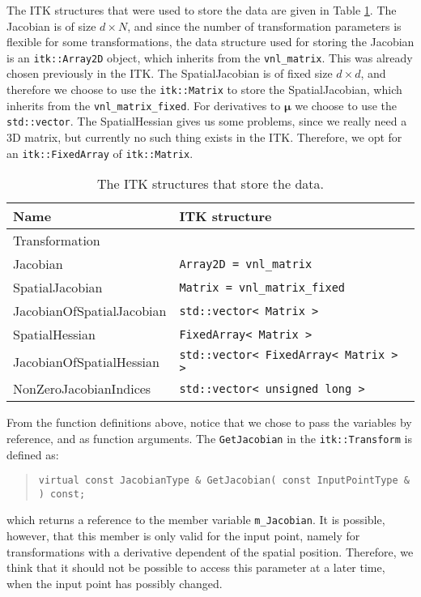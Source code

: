 \documentclass[]{article}
\newcommand{\vmu}{\bm{\mu}}
\begin{document}
The ITK structures that were used to store the data are given in
Table \ref{tab:datastructures}. The Jacobian is of size $d \times
N$, and since the number of transformation parameters is flexible
for some transformations, the data structure used for storing the
Jacobian is an \texttt{itk::Array2D} object, which inherits from the
\texttt{vnl\_matrix}. This was already chosen previously in the ITK.
The SpatialJacobian is of fixed size $d \times d$, and therefore we
choose to use the \texttt{itk::Matrix} to store the SpatialJacobian,
which inherits from the \texttt{vnl\_matrix\_fixed}. For derivatives
to $\vmu$ we choose to use the \texttt{std::vector}. The
SpatialHessian gives us some problems, since we really need a 3D
matrix, but currently no such thing exists in the ITK. Therefore, we
opt for an \texttt{itk::FixedArray} of \texttt{itk::Matrix}.

\begin{table}[h]
\centering
\begin{tabular}{ll}
\toprule \toprule
Name & ITK structure \\
\midrule Transformation &  \\
Jacobian & \texttt{Array2D = vnl\_matrix} \\
SpatialJacobian & \texttt{Matrix = vnl\_matrix\_fixed} \\
JacobianOfSpatialJacobian & \texttt{std::vector< Matrix >} \\
SpatialHessian & \texttt{FixedArray< Matrix >}\footnotemark \\
JacobianOfSpatialHessian & \texttt{std::vector< FixedArray< Matrix > >} \\
NonZeroJacobianIndices & \texttt{std::vector< unsigned long >} \\
\bottomrule \bottomrule
\end{tabular}
\caption{The ITK structures that store the
data.}\label{tab:datastructures}
\end{table}

From the function definitions above, notice that we chose to pass
the variables by reference, and as function arguments. The
\texttt{GetJacobian} in the \texttt{itk::Transform} is defined as:
\begin{quote}
\begin{verbatim}
virtual const JacobianType & GetJacobian( const InputPointType & ) const;
\end{verbatim}
\end{quote}
which returns a reference to the member variable
\texttt{m\_Jacobian}. It is possible, however, that this member is
only valid for the input point, namely for transformations with a
derivative dependent of the spatial position. Therefore, we think
that it should not be possible to access this parameter at a later
time, when the input point has possibly changed.
\end{document}
